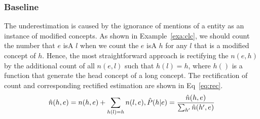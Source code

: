 %
%

\subsubsection{Baseline}
The underestimation is caused by the ignorance of mentions of a entity as an instance of modified concepts. As shown in Example~\ref{exa:clc}, we should count the number that $e$ isA ${l}$ when we count the $e$ isA ${h}$ for any $l$ that is a modified concept of $h$.
Hence, the most straightforward approach is rectifying the $n(e, h)$ by the additional count
of all $n(e, l)$ such that $h(l)=h$, where $h()$ is a function that generate the head concept of a long concept. The rectification of count and corresponding rectified estimation are shown in Eq~\ref{eq:rec}. 
\begin{equation}
\small
\hat{n}(h, e)={n}(h, e)+\sum_{ h(l)=h} n(l,e), \hat{P}(h|e)=\frac{\hat{n}(h, e)}{\sum_{{h'}}{\hat{n}({h'}}, e)}
\label{eq:rec}
\end{equation}


